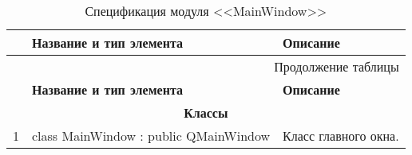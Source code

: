 \small
\singlespacing
\begin{longtable}[h]{|p{}|p{}|p{}|}
  \caption{Спецификация модуля <<MainWindow>>}
	\\ \hline
	  \textbf{\No}                  &
	  \textbf{Название и тип элемента}  &
	  \textbf{Описание}
	\\ \hline
  \endfirsthead

  \multicolumn{3}{r}{Продолжение таблицы \thetable{}}
  \\ \hline
	  \textbf{\No}                  &
	  \textbf{Название и тип элемента}  &
	  \textbf{Описание}
	\\ \hline
  \endhead

  \multicolumn{3}{|c|}{\textbf{Классы}} \\
  \hline
  1 & class MainWindow : public QMainWindow & Класс главного окна. \\ \hline
\end{longtable}
\normalsize
\onehalfspacing


